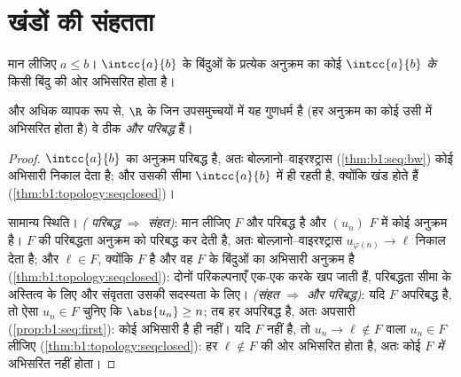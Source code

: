 \section{खंडों की संहतता}

\begin{theorem}[खंड अनुक्रमीय रूप से संहत हैं]\label{thm:b1:topology:compact}
मान लीजिए $a \leq b$। $\intcc{a}{b}$ के बिंदुओं के प्रत्येक अनुक्रम का कोई
 $\intcc{a}{b}$ \emph{के} किसी बिंदु की ओर अभिसरित होता
है।

और अधिक व्यापक रूप से, $\R$ के जिन उपसमुच्चयों में यह गुणधर्म है (हर अनुक्रम
का कोई  उसी  में अभिसरित होता है) वे ठीक \emph{ और
परिबद्ध}  हैं।
\end{theorem}

\begin{proof}
$\intcc{a}{b}$ का अनुक्रम परिबद्ध है, अतः बोल्ज़ानो--वाइरश्ट्रास
(\cref{thm:b1:seq:bw}) कोई अभिसारी  निकाल देता है; और उसकी सीमा
$\intcc{a}{b}$ में ही रहती है, क्योंकि खंड  होते हैं
(\cref{thm:b1:topology:seqclosed})।

सामान्य स्थिति। \emph{( परिबद्ध $\Rightarrow$ संहत)}: मान लीजिए $F$
 और परिबद्ध है और $(u_n)$ $F$ में कोई अनुक्रम है। $F$ की परिबद्धता
अनुक्रम को परिबद्ध कर देती है, अतः बोल्ज़ानो--वाइरश्ट्रास $u_{\varphi(n)}
\to \ell$ निकाल देता है; और $\ell \in F$, क्योंकि $F$  है और वह
 $F$ के बिंदुओं का अभिसारी अनुक्रम है
(\cref{thm:b1:topology:seqclosed}): दोनों परिकल्पनाएँ एक-एक करके खप जाती
हैं, परिबद्धता सीमा के अस्तित्व के लिए और संवृतता उसकी सदस्यता के लिए।
\emph{(संहत $\Rightarrow$  और परिबद्ध)}: यदि $F$ अपरिबद्ध है, तो ऐसा
$u_n \in F$ चुनिए कि $\abs{u_n} \geq n$; तब हर  अपरिबद्ध है, अतः
अपसारी (\cref{prop:b1:seq:first}): कोई अभिसारी  है ही नहीं। यदि $F$
 नहीं है, तो $u_n \to \ell \notin F$ वाला $u_n \in F$ लीजिए
(\cref{thm:b1:topology:seqclosed}): हर  $\ell \notin F$ की ओर
अभिसरित होता है, अतः कोई  $F$ \emph{में} अभिसरित नहीं होता।
\end{proof}

